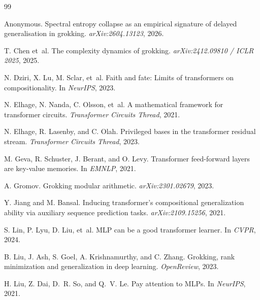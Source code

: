\documentclass{article}
\begin{document}

\begin{thebibliography}{99}

Anonymous.
\newblock Spectral entropy collapse as an empirical signature of delayed generalisation in grokking.
\newblock \emph{arXiv:2604.13123}, 2026.

T. Chen et~al.
\newblock The complexity dynamics of grokking.
\newblock \emph{arXiv:2412.09810 / ICLR 2025}, 2025.

N. Dziri, X. Lu, M. Sclar, et~al.
\newblock Faith and fate: Limits of transformers on compositionality.
\newblock In \emph{NeurIPS}, 2023.

N. Elhage, N. Nanda, C. Olsson, et~al.
\newblock A mathematical framework for transformer circuits.
\newblock \emph{Transformer Circuits Thread}, 2021.

N. Elhage, R. Lasenby, and C. Olah.
\newblock Privileged bases in the transformer residual stream.
\newblock \emph{Transformer Circuits Thread}, 2023.

M. Geva, R. Schuster, J. Berant, and O. Levy.
\newblock Transformer feed-forward layers are key-value memories.
\newblock In \emph{EMNLP}, 2021.

A. Gromov.
\newblock Grokking modular arithmetic.
\newblock \emph{arXiv:2301.02679}, 2023.

Y. Jiang and M. Bansal.
\newblock Inducing transformer's compositional generalization ability via auxiliary sequence prediction tasks.
\newblock \emph{arXiv:2109.15256}, 2021.

S. Lin, P. Lyu, D. Liu, et~al.
\newblock MLP can be a good transformer learner.
\newblock In \emph{CVPR}, 2024.

B. Liu, J. Ash, S. Goel, A. Krishnamurthy, and C. Zhang.
\newblock Grokking, rank minimization and generalization in deep learning.
\newblock \emph{OpenReview}, 2023.

H. Liu, Z. Dai, D.~R. So, and Q.~V. Le.
\newblock Pay attention to MLPs.
\newblock In \emph{NeurIPS}, 2021.


\end{thebibliography}
\end{document}
